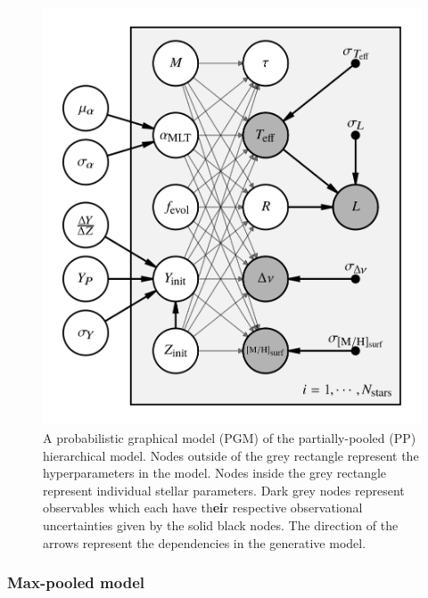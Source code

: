 \documentclass[fleqn,usenatbib]{mnras}
\begin{document}
%
\begin{figure}
    \includegraphics[width=\linewidth]{figures/partial_pool_pgm.png}
    \caption{A probabilistic graphical model (PGM) of the partially-pooled (PP) hierarchical model. Nodes outside of the grey rectangle represent the hyperparameters in the model. Nodes inside the grey rectangle represent individual stellar parameters. Dark grey nodes represent observables which each have th\textbf{\color{red}ei}r respective observational uncertainties given by the solid black nodes. The direction of the arrows represent the dependencies in the generative model.}
    \label{fig:pgm}
\end{figure}
%

\subsubsection{Max-pooled model}\label{sec:mp}


\end{document}
